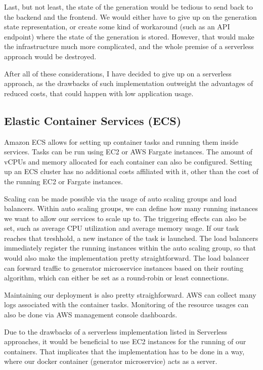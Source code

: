 		Last, but not least, the state of the generation would be tedious to send back to the backend and the frontend. 
		We would either have to give up on the
		generation state representation, or create some kind of workaround (such as an API endpoint) where the state of the generation is
		stored. However, that would make the infrastructure much more complicated, and the whole premise of a serverless approach would 
		be destroyed.

		After all of these considerations, I have decided to give up on a serverless approach, as the drawbacks of such implementation
		outweight the advantages of reduced costs, that could happen with low application usage.
		

	\subsection{Elastic Container Services (ECS)}
		Amazon ECS allows for setting up container tasks and running them inside services. Tasks can be run using EC2 or AWS Fargate instances.
		The amount of vCPUs and memory allocated for each container can also be configured.
		Setting up an ECS cluster has no additional costs affiliated with it, other than the cost of the running EC2 or Fargate instances.

		Scaling can be made possible via the usage of auto scaling groups and load balancers. Within auto scaling groups, we can define how many
		running instances we want to allow our services to scale up to. The triggering effects can also be set, such as average CPU utilization and 
		average memory usage. If our task reaches that treshhold, a new instance of the task is launched.  
		The load balancers immediately register the running instances within the auto
		scaling group, so that would also make the implementation pretty straightforward. The load balancer can forward traffic to generator 
		microservice instances based on their routing algorithm, which can either be set as a round-robin or least connections.

		Maintaining our deployment is also pretty straighforward. AWS can collect many logs associated with 
		the container tasks. Monitoring of the resource usages can also be done via AWS management console dashboards.

		Due to the drawbacks of a serverless implementation listed in Serverless approaches, it would be beneficial to use EC2 instances
		for the running of our containers. That implicates that the implementation has to be done in a way, where our docker container (generator
		microservice) acts as a server.

